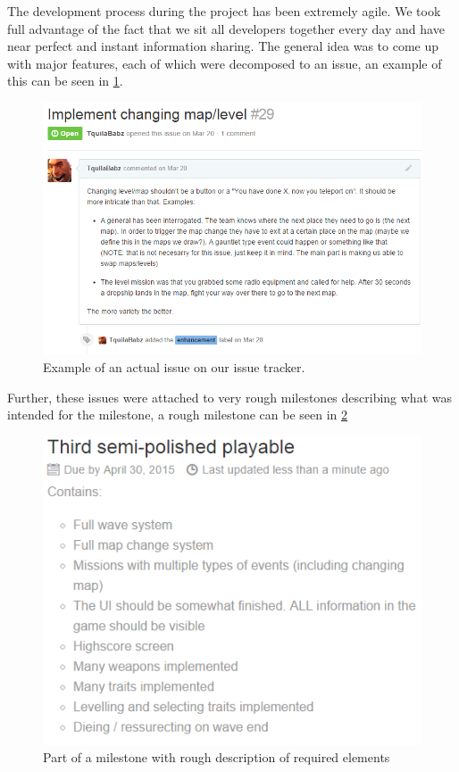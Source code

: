 The development process during the project has been extremely agile. We took full advantage of the fact that we sit all developers together every day and have near perfect and instant information sharing. The general idea was to come up with major features, each of which were decomposed to an issue, an example of this can be seen in \ref{evaluation:workprocess:issue}. 

\begin{figure}[H]
\centering
\includegraphics[width=1\textwidth]{figures/evaluation/issue}
\caption{Example of an actual issue on our issue tracker.}
\label{evaluation:workprocess:issue}
\end{figure}

Further, these issues were attached to very rough milestones describing what was intended for the milestone, a rough milestone can be seen in \ref{evaluation:workprocess:milestone}

\begin{figure}[H]
\centering
\includegraphics[width=1\textwidth]{figures/evaluation/milestone}
\caption{Part of a milestone with rough description of required elements}
\label{evaluation:workprocess:milestone}
\end{figure}

